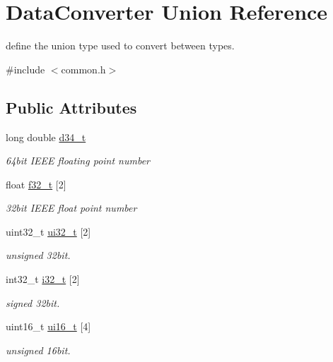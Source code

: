 \hypertarget{union_data_converter}{\section{Data\-Converter Union Reference}
\label{union_data_converter}
}


define the union type used to convert between types.  




{\ttfamily \#include $<$common.\-h$>$}

\subsection*{Public Attributes}
\begin{DoxyCompactItemize}
\item 
long double \hyperlink{union_data_converter_ae9dce194bf800c0ea89942da406dc525}{d34\-\_\-t}
\begin{DoxyCompactList}\small\item\em 64bit I\-E\-E\-E floating point number \end{DoxyCompactList}\item 
float \hyperlink{union_data_converter_ac99b9f7c8af24916e3b7993c1928b4f2}{f32\-\_\-t} \mbox{[}2\mbox{]}
\begin{DoxyCompactList}\small\item\em 32bit I\-E\-E\-E float point number \end{DoxyCompactList}\item 
uint32\-\_\-t \hyperlink{union_data_converter_a20845be2f89b1012e3942dca4c5fa117}{ui32\-\_\-t} \mbox{[}2\mbox{]}
\begin{DoxyCompactList}\small\item\em unsigned 32bit. \end{DoxyCompactList}\item 
int32\-\_\-t \hyperlink{union_data_converter_a0cf5f8f2f3ba3f3e1a1c44a21248d910}{i32\-\_\-t} \mbox{[}2\mbox{]}
\begin{DoxyCompactList}\small\item\em signed 32bit. \end{DoxyCompactList}\item 
uint16\-\_\-t \hyperlink{union_data_converter_ae96584b1dad4adab583405970fc89137}{ui16\-\_\-t} \mbox{[}4\mbox{]}
\begin{DoxyCompactList}\small\item\em unsigned 16bit. \end{DoxyCompactList}\item 

\end{DoxyCompactItemize}
